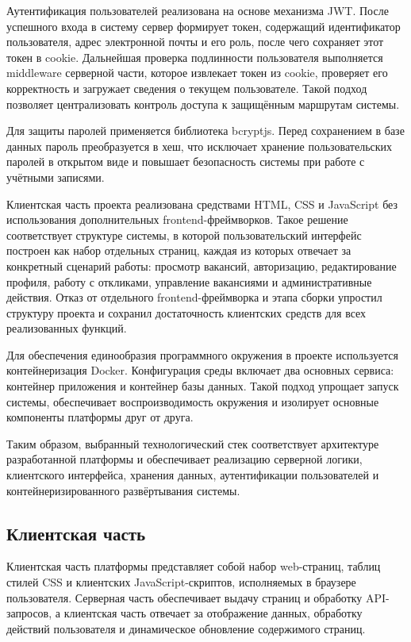 Аутентификация пользователей реализована на основе механизма JWT. После успешного входа в систему сервер формирует токен, содержащий идентификатор пользователя, адрес электронной почты и его роль, после чего сохраняет этот токен в cookie. Дальнейшая проверка подлинности пользователя выполняется middleware серверной части, которое извлекает токен из cookie, проверяет его корректность и загружает сведения о текущем пользователе. Такой подход позволяет централизовать контроль доступа к защищённым маршрутам системы.

Для защиты паролей применяется библиотека bcryptjs. Перед сохранением в базе данных пароль преобразуется в хеш, что исключает хранение пользовательских паролей в открытом виде и повышает безопасность системы при работе с учётными записями.

Клиентская часть проекта реализована средствами HTML, CSS и JavaScript без использования дополнительных frontend-фреймворков. Такое решение соответствует структуре системы, в которой пользовательский интерфейс построен как набор отдельных страниц, каждая из которых отвечает за конкретный сценарий работы: просмотр вакансий, авторизацию, редактирование профиля, работу с откликами, управление вакансиями и административные действия. Отказ от отдельного frontend-фреймворка и этапа сборки упростил структуру проекта и сохранил достаточность клиентских средств для всех реализованных функций.

Для обеспечения единообразия программного окружения в проекте используется контейнеризация Docker. Конфигурация среды включает два основных сервиса: контейнер приложения и контейнер базы данных. Такой подход упрощает запуск системы, обеспечивает воспроизводимость окружения и изолирует основные компоненты платформы друг от друга.

Таким образом, выбранный технологический стек соответствует архитектуре разработанной платформы и обеспечивает реализацию серверной логики, клиентского интерфейса, хранения данных, аутентификации пользователей и контейнеризированного развёртывания системы.

\subsection{Клиентская часть}

Клиентская часть платформы представляет собой набор web-страниц, таблиц стилей CSS и клиентских JavaScript-скриптов, исполняемых в браузере пользователя. Серверная часть обеспечивает выдачу страниц и обработку API-запросов, а клиентская часть отвечает за отображение данных, обработку действий пользователя и динамическое обновление содержимого страниц.

